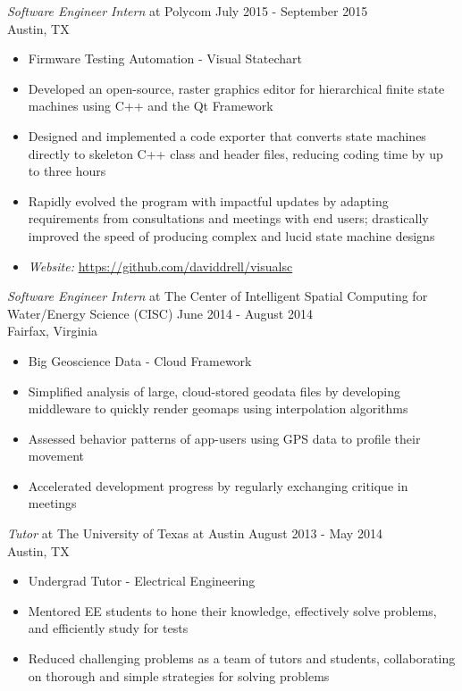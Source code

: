 \documentclass[line,margin]{res}
\begin{document}
\begin{resume}
                {\sl Software Engineer Intern} at Polycom \hfill            July 2015 - September 2015\\        
                Austin, TX 
                \begin{itemize}  \itemsep -2pt %
                  \item         Firmware Testing Automation - Visual Statechart 
                 \item Developed an open-source, raster graphics editor for hierarchical finite state machines using C++ and the Qt Framework
                 \item Designed and implemented a code exporter that converts state machines directly to skeleton C++ class and header files, reducing coding time by up to three hours
                 \item Rapidly evolved the program with impactful updates by adapting requirements from consultations and meetings with end users; drastically improved the speed of producing complex and lucid state machine designs
                 \item \textit{Website: }  \url{https://github.com/daviddrell/visualsc}
                 \end{itemize}

                 {\sl Software Engineer Intern} at The Center of Intelligent Spatial Computing for Water/Energy Science (CISC) \hfill June 2014 - August 2014\\
                 Fairfax, Virginia
                 \begin{itemize}
                 \item Big Geoscience Data - Cloud Framework
                 \item Simplified analysis of large, cloud-stored geodata files by developing middleware to quickly render geomaps using interpolation algorithms
                 \item Assessed behavior patterns of app-users using GPS data to profile their movement
                 \item Accelerated development progress by regularly exchanging critique in meetings
                 \end{itemize}

                 {\sl Tutor} at The University of Texas at Austin \hfill August 2013 - May 2014\\
                 Austin, TX
                 \begin{itemize}
                 \item Undergrad Tutor - Electrical Engineering
                 \item Mentored EE students to hone their knowledge, effectively solve problems, and efficiently study for tests
                 \item Reduced challenging problems as a team of tutors and students, collaborating on thorough and simple strategies for solving problems
                 \end{itemize}
 

\end{resume}
\end{document}
